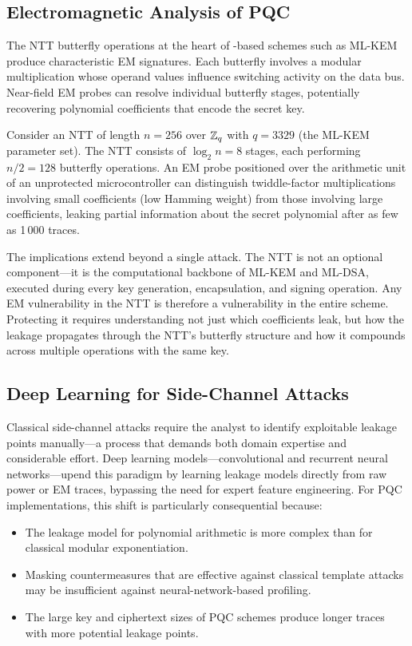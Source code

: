 \subsection{Electromagnetic Analysis of PQC}
\label{subsec:em-analysis}

The NTT butterfly operations at the heart of \mlwe{}-based schemes such as ML-KEM produce characteristic EM signatures.  Each butterfly involves a modular multiplication whose operand values influence switching activity on the data bus.  Near-field EM probes can resolve individual butterfly stages, potentially recovering polynomial coefficients that encode the secret key.

\begin{example}
\label{ex:em-ntt}
Consider an NTT of length $n = 256$ over $\mathbb{Z}_q$ with $q = 3329$ (the ML-KEM parameter set).  The NTT consists of $\log_2 n = 8$ stages, each performing $n/2 = 128$ butterfly operations.  An EM probe positioned over the arithmetic unit of an unprotected microcontroller can distinguish twiddle-factor multiplications involving small coefficients (low Hamming weight) from those involving large coefficients, leaking partial information about the secret polynomial after as few as 1\,000 traces.
\end{example}

The implications extend beyond a single attack.  The NTT is not an optional component---it is the computational backbone of ML-KEM and ML-DSA, executed during every key generation, encapsulation, and signing operation.  Any EM vulnerability in the NTT is therefore a vulnerability in the entire scheme.  Protecting it requires understanding not just which coefficients leak, but how the leakage propagates through the NTT's butterfly structure and how it compounds across multiple operations with the same key.

\subsection{Deep Learning for Side-Channel Attacks}
\label{subsec:deep-learning-sca}

Classical side-channel attacks require the analyst to identify exploitable leakage points manually---a process that demands both domain expertise and considerable effort.  Deep learning models---convolutional and recurrent neural networks---upend this paradigm by learning leakage models directly from raw power or EM traces, bypassing the need for expert feature engineering.  For PQC implementations, this shift is particularly consequential because:
\begin{itemize}
\item The leakage model for polynomial arithmetic is more complex than for classical modular exponentiation.
\item Masking countermeasures that are effective against classical template attacks may be insufficient against neural-network-based profiling.
\item The large key and ciphertext sizes of PQC schemes produce longer traces with more potential leakage points.
\end{itemize}

